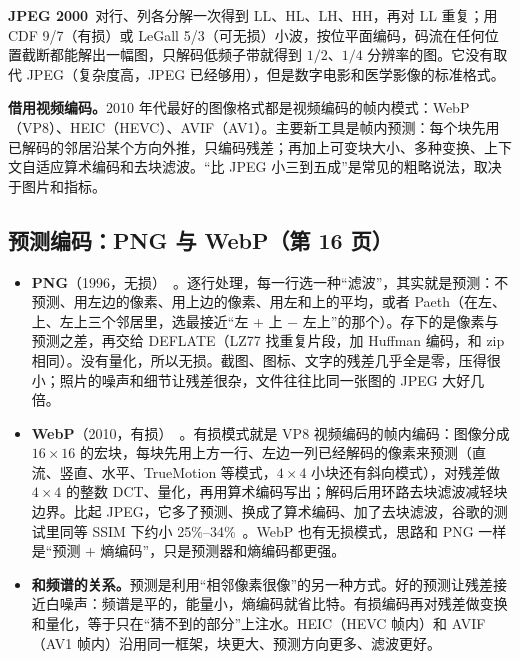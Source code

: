 \textbf{JPEG 2000}~\cite{skodras2001}对行、列各分解一次得到 LL、HL、LH、HH，再对 LL 重复；用 CDF 9/7（有损）或 LeGall 5/3（可无损）小波，按位平面编码，码流在任何位置截断都能解出一幅图，只解码低频子带就得到 $1/2$、$1/4$ 分辨率的图。它没有取代 JPEG（复杂度高，JPEG 已经够用），但是数字电影和医学影像的标准格式。

\textbf{借用视频编码。}2010 年代最好的图像格式都是视频编码的帧内模式：WebP（VP8）、HEIC（HEVC）、AVIF（AV1）。主要新工具是帧内预测：每个块先用已解码的邻居沿某个方向外推，只编码残差；再加上可变块大小、多种变换、上下文自适应算术编码和去块滤波。“比 JPEG 小三到五成”是常见的粗略说法，取决于图片和指标。

\subsection{预测编码：PNG 与 WebP（第 16 页）}\label{sec:pred}
\begin{itemize}
  \item \textbf{PNG}（1996，无损）~\cite{boutell1997}。逐行处理，每一行选一种“滤波”，其实就是预测：不预测、用左边的像素、用上边的像素、用左和上的平均，或者 Paeth（在左、上、左上三个邻居里，选最接近“左 + 上 $-$ 左上”的那个）。存下的是像素与预测之差，再交给 DEFLATE（LZ77 找重复片段，加 Huffman 编码，和 zip 相同）。没有量化，所以无损。截图、图标、文字的残差几乎全是零，压得很小；照片的噪声和细节让残差很杂，文件往往比同一张图的 JPEG 大好几倍。
  \item \textbf{WebP}（2010，有损）~\cite{bankoski2011,zern2024}。有损模式就是 VP8 视频编码的帧内编码：图像分成 $16\times16$ 的宏块，每块先用上方一行、左边一列已经解码的像素来预测（直流、竖直、水平、TrueMotion 等模式，$4\times4$ 小块还有斜向模式），对残差做 $4\times4$ 的整数 DCT、量化，再用算术编码写出；解码后用环路去块滤波减轻块边界。比起 JPEG，它多了预测、换成了算术编码、加了去块滤波，谷歌的测试里同等 SSIM 下约小 25\%--34\%~\cite{webpstudy}。WebP 也有无损模式，思路和 PNG 一样是“预测 + 熵编码”，只是预测器和熵编码都更强。
  \item \textbf{和频谱的关系。}预测是利用“相邻像素很像”的另一种方式。好的预测让残差接近白噪声：频谱是平的，能量小，熵编码就省比特。有损编码再对残差做变换和量化，等于只在“猜不到的部分”上注水。HEIC（HEVC 帧内）和 AVIF（AV1 帧内）沿用同一框架，块更大、预测方向更多、滤波更好。
\end{itemize}

